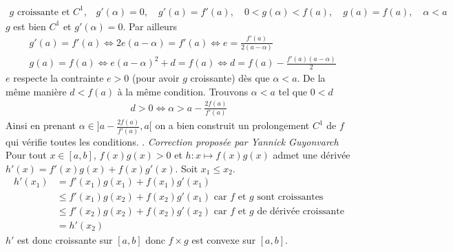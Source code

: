 \documentclass{report}
\begin{document}
\begin{align*}
    g\text{ croissante et $C^1$,}\quad g'(\alpha)=0,\quad g'(a)=f'(a),\quad 0<g(\alpha)<f(a),\quad g(a)=f(a),\quad \alpha<a
\end{align*}
\newline
$g$ est bien $C^1$ et $g'(\alpha)=0$. Par ailleurs
\begin{align*}
    &g'(a)=f'(a)\iff2e(a-\alpha)=f'(a)\iff e=\frac{f'(a)}{2(a-\alpha)} \\
    &g(a)=f(a)\iff e(a-\alpha)^2+d=f(a)\iff d=f(a)-\frac{f'(a)(a-\alpha)}{2}
\end{align*}
\newline \newline
$e$ respecte la contrainte $e>0$ (pour avoir $g$ croissante) dès que $\alpha<a$. De la même manière $d<f(a)$ à la même condition.
\newline \newline
Trouvons $\alpha<a$ tel que $0<d$
\begin{align*}
    d>0\iff\alpha>a-\frac{2f(a)}{f'(a)}
\end{align*}
\newline
Ainsi en prenant $\alpha\in]a-\frac{2f(a)}{f'(a)},a[$ on a bien construit un prolongement $C^1$ de $f$ qui vérifie toutes les conditions.\newline
{}. \hfill \textit{Correction proposée par Yannick Guyonvarch}\newline
Pour tout $x\in[a,b]$, $f(x)g(x)>0$ et $h:x\mapsto f(x)g(x)$ admet une dérivée $h'(x)=f'(x)g(x)+f(x)g'(x)$.
\newline
Soit $x_1\leq x_2$.
\begin{align*}
    h'(x_1)&=f'(x_1)g(x_1)+f(x_1)g'(x_1) \\
    &\leq f'(x_1)g(x_2)+f(x_2)g'(x_1)\text{ car $f$ et $g$ sont croissantes} \\
    &\leq f'(x_2)g(x_2)+f(x_2)g'(x_2)\text{ car $f$ et $g$ de dérivée croissante}\\
    &= h'(x_2)
\end{align*}
\newline
$h'$ est donc croissante sur $[a,b]$ donc $f\times g$ est convexe sur $[a,b]$.
\end{document}
